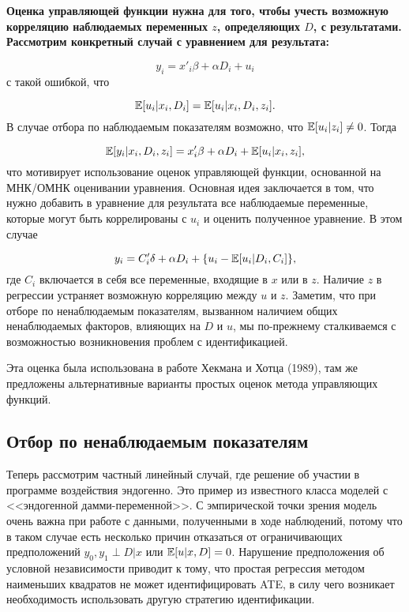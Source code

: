  \bfseries Оценка управляющей функции \mdseries нужна для того, чтобы учесть возможную корреляцию наблюдаемых переменных $z$, определяющих $D$, с результатами. Рассмотрим конкретный случай с уравнением для результата:

\begin{equation}
\label{eq25.28}
y_i = x'_i \beta + \alpha D_i + u_i
\end{equation}
с такой ошибкой, что 

$$
\mathbb{E} [u_i | x_i, D_i] = \mathbb{E} [u_i | x_i, D_i, z_i]. 
$$
В случае отбора по наблюдаемым показателям возможно, что $\mathbb{E}[u_i|z_i] \ne 0$. Тогда

\begin{equation}
\label{eq25.29}
\mathbb{E} [y_i | x_i, D_i, z_i] = x'_i \beta + \alpha D_i + \mathbb{E} [u_i | x_i, z_i],
\end{equation}
что мотивирует использование оценок управляющей функции, основанной на МНК/ОМНК оценивании уравнения. Основная идея заключается в том, что нужно добавить в уравнение для результата все наблюдаемые переменные, которые могут быть коррелированы с $u_i$ и оценить полученное уравнение. В этом случае

\begin{equation}
\label{eq25.30}
y_i = C'_i \delta + \alpha D_i + \{ u_i - \mathbb{E}[u_i | D_i, C_i] \},
\end{equation}
где $C_i$ включается в себя все переменные, входящие в $x$ или в $z$. Наличие $z$ в регрессии устраняет возможную корреляцию между $u$ и $z$. Заметим, что при отборе по ненаблюдаемым показателям, вызванном наличием общих ненаблюдаемых факторов, влияющих на $D$ и $u$, мы по-прежнему сталкиваемся с возможностью возникновения проблем с идентификацией. 

Эта оценка была использована в работе Хекмана и Хотца (1989), там же предложены альтернативные варианты простых оценок метода управляющих функций. 

\subsection{Отбор по ненаблюдаемым показателям}

Теперь рассмотрим частный линейный случай, где решение об участии в программе воздействия эндогенно. Это пример из известного класса моделей с <<эндогенной дамми-переменной>>. С эмпирической точки зрения модель очень важна при работе с данными, полученными в ходе наблюдений, потому что в таком случае есть несколько причин отказаться от ограничивающих предположений $y_0, y_1 \perp D | x$ или $\mathbb{E}[u|x, D] = 0$. Нарушение предположения об условной независимости приводит к тому, что простая регрессия методом наименьших квадратов не может идентифицировать ATE, в силу чего возникает необходимость использовать другую стратегию идентификации. 

